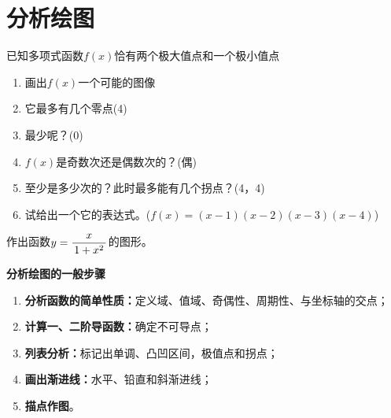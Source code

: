 \section{分析绘图}

\egz 已知多项式函数$f(x)$恰有两个极大值点和一个极小值点
\begin{enumerate}[(1)]
  \setlength{\itemindent}{1cm}
  \item 画出$f(x)$一个可能的图像
  \item 它最多有几个零点\hfill(4)
  \item 最少呢？\hfill(0)
  \item $f(x)$是奇数次还是偶数次的？\hfill(偶)
  \item 至少是多少次的？此时最多能有几个拐点？\hfill(4，4)
  \item 试给出一个它的表达式。\hfill($f(x)=(x-1)(x-2)(x-3)(x-4)$)
\end{enumerate}


\egz 作出函数$y=\displaystyle\frac{\,{x}\,}{\,{1+x^2}\,}$的图形。

\begin{center}
\end{center}

\begin{thx}
	{\bf 分析绘图的一般步骤}
	\begin{enumerate}[(1)]
	  \item {\bf 分析函数的简单性质：}定义域、值域、奇偶性、周期性、与坐标轴的交点；
	  \item {\bf 计算一、二阶导函数：}确定不可导点；
	  \item {\bf 列表分析：}标记出单调、凸凹区间，极值点和拐点；
	  \item {\bf 画出渐进线：}水平、铅直和斜渐进线；
	  \item {\bf 描点作图}。
	\end{enumerate}
\end{thx}

